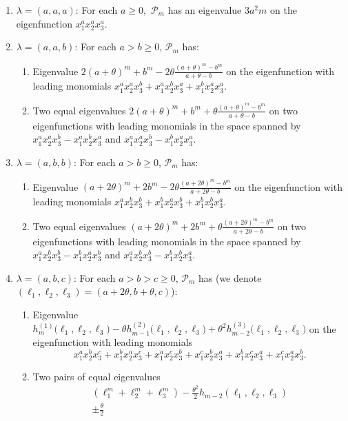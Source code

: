 \documentclass[11pt]{article}
\theoremstyle{definition}
\numberwithin{equation}{section}
\newcommand{\PP}{\mathcal P}
\begin{document}
\begin{enumerate}[label=(\roman*)]
 \item $\lambda=(a,a,a)$: For each $a\ge 0,$ $\PP_m$ has an eigenvalue $3 a^2 m$ on the eigenfunction $x_1^a x_2^a x_3^a$.
 \item $\lambda=(a,a,b)$: For each $a>b \ge 0$, $\PP_m$ has:
  \begin{enumerate}
   \item Eigenvalue $2 (a+\theta)^m + b^m - 2 \theta\frac{(a+\theta)^m-b^m}{a+\theta-b}$ on the eigenfunction with leading monomials $x_1^a x_2^a x_3^b + x_1^a x_2^b x_3^a+ x_1^b x_2^a x_3^a$.
   \item Two equal eigenvalues $2 (a+\theta)^m + b^m + \theta\frac{(a+\theta)^m-b^m}{a+\theta-b}$ on two eigenfunctions with leading monomials in the space spanned by $x_1^a x_2^a x_3^b - x_1^a x_2^b x_3^a$ and $x_1^a x_2^a x_3^b - x_1^b x_2^a x_3^a$.
   \end{enumerate}
 \item $\lambda=(a,b,b)$: For each $a>b \ge 0$, $\PP_m$ has:
   \begin{enumerate}
    \item Eigenvalue  $(a+2\theta)^m + 2b^m - 2 \theta\frac{(a+2\theta)^m-b^m}{a+2\theta-b}$  on the eigenfunction with leading monomials $x_1^a x_2^b x_3^b + x_1^b x_2^a x_3^b+ x_1^b x_2^b x_3^a$.
    \item Two equal eigenvalues $(a+2\theta)^m + 2b^m + \theta\frac{(a+2\theta)^m-b^m}{a+2\theta-b}$  on two eigenfunctions with leading monomials in the space spanned by $x_1^a x_2^b x_3^b - x_1^b x_2^a x_3^b$ and $x_1^a x_2^b x_3^b - x_1^b x_2^b x_3^a$.
   \end{enumerate}
 \item $\lambda=(a,b,c)$: For each $a>b>c \ge 0$, $\PP_m$ has (we denote $(\ell_1,\ell_2,\ell_3)=(a+2\theta,b+\theta,c)$):
   \begin{enumerate}
    \item Eigenvalue $h^{(1)}_m\bigl(\ell_1,\ell_2,\ell_3\bigr)-\theta h^{(2)}_{m-1}\bigl(\ell_1,\ell_2,\ell_3\bigr)+\theta^2  h^{(3)}_{m-2}\bigl(\ell_1,\ell_2,\ell_3\bigr)$ on the eigenfunction with leading monomials
    $$x_1^a x_2^b x_3^c +x_1^b x_2^a x_3^c+x_1^a x_2^c x_3^b+x_1^c x_2^b x_3^a+x_1^b x_2^c x_3^a+x_1^c x_2^a x_3^b.$$
    \item Two pairs of equal eigenvalues
    \begin{multline} \label{eq_irrational_ev}
      \left(  \ell_{1}^{m}+\ell_{2}^{m}+\ell_{3}^{m}\right)
      -\frac{\theta^{2}}{2}h_{m-2}\left(  \ell_{1},\ell_{2},\ell_{3}\right) \\  \pm\frac{\theta}{2}

\end{multline}
\end{enumerate}
\end{enumerate}
\end{document}

